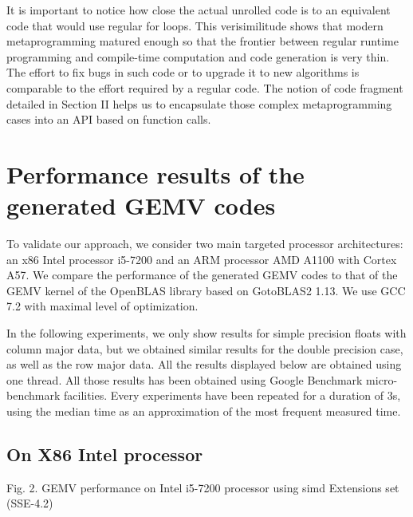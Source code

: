 \documentclass[../main]{subfiles}
\begin{document}
It is important to notice how close the actual unrolled code
is to an equivalent code that would use regular for loops. This
verisimilitude shows that modern metaprogramming matured
enough so that the frontier between regular runtime programming
and compile-time computation and code generation is
very thin. The effort to fix bugs in such code or to upgrade
it to new algorithms is comparable to the effort required
by a regular code. The notion of code fragment detailed
in Section II helps us to encapsulate those complex metaprogramming
cases into an API based on function calls.

\section{
  Performance results of the generated GEMV codes
}

To validate our approach, we consider two main targeted
processor architectures: an x86 Intel processor i5-7200 and an
ARM processor AMD A1100 with Cortex A57. We compare
the performance of the generated GEMV codes to that of the
GEMV kernel of the OpenBLAS library based on GotoBLAS2 1.13\cite{hpcs21}.
We use GCC 7.2\cite{hpcs22} with maximal level of optimization.

In the following experiments, we only show results
for simple precision floats with column major data, but we
obtained similar results for the double precision case, as well
as the row major data. All the results displayed below are
obtained using one thread. All those results has been obtained
using Google Benchmark micro-benchmark facilities. Every
experiments have been repeated for a duration of 3s, using
the median time as an approximation of the most frequent
measured time.

\subsection{
  On X86 Intel processor
}


Fig. 2. GEMV performance on Intel i5-7200 processor using \gls{simd} Extensions
set (SSE-4.2)
\end{document}
